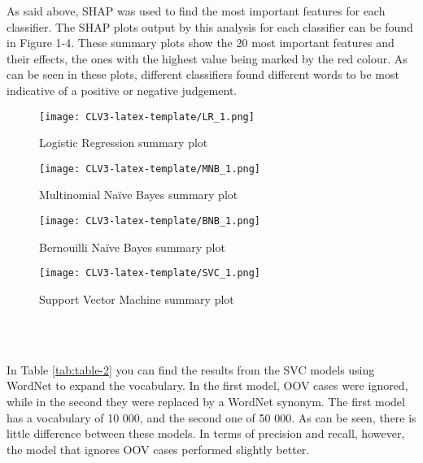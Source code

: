 \documentclass[final]{clv3} %
\begin{document}
As said above, SHAP \cite{shap} was used to find the most important features for each classifier. The SHAP plots output by this analysis for each classifier can be found in Figure 1-4.  These summary plots show the 20 most important features and their effects, the ones with the highest value being marked by the red colour. As can be seen in these plots, different classifiers found different words to be most indicative of a positive or negative judgement.\\


\begin{figure}[h]
    \texttt{[image: CLV3-latex-template/LR\_1.png]}
    \caption{Logistic Regression summary plot}\label{fig:shap-lr}
\endminipage
{}
    \texttt{[image: CLV3-latex-template/MNB\_1.png]}
    \caption{Multinomial Naïve Bayes summary plot}\label{fig:shap-mnb}
\endminipage
\end{figure}

\begin{figure}[h]
%
    \texttt{[image: CLV3-latex-template/BNB\_1.png]}
    \caption{Bernouilli Naïve Bayes summary plot}\label{fig:shap-bnb}
\endminipage
{}%
    \texttt{[image: CLV3-latex-template/SVC\_1.png]}
    \caption{Support Vector Machine summary plot}\label{fig:shap-bnb}
\endminipage
\end{figure}\\\

\newpage

In Table \ref{tab:table-2} you can find the results from the SVC models using WordNet to expand the vocabulary. In the first model, OOV cases were ignored, while in the second they were replaced by a WordNet synonym. The first model has a vocabulary of 10 000, and the second one of 50 000. As can be seen, there is little difference between these models. In terms of precision and recall, however, the model that ignores OOV cases performed slightly better.
\end{document}
